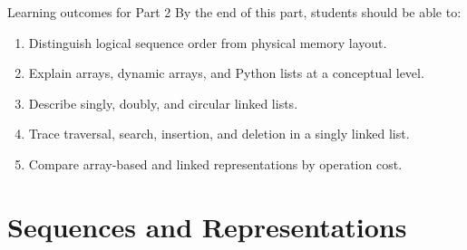 \documentclass[aspectratio=169]{beamer}
\begin{document}
\begin{frame}{Learning outcomes for Part 2}
  By the end of this part, students should be able to:
  \begin{enumerate}
    \item Distinguish logical sequence order from physical memory layout.
    \item Explain arrays, dynamic arrays, and Python lists at a conceptual level.
    \item Describe singly, doubly, and circular linked lists.
    \item Trace traversal, search, insertion, and deletion in a singly linked list.
    \item Compare array-based and linked representations by operation cost.
  \end{enumerate}
\end{frame}

\section{Sequences and Representations}
\end{document}
